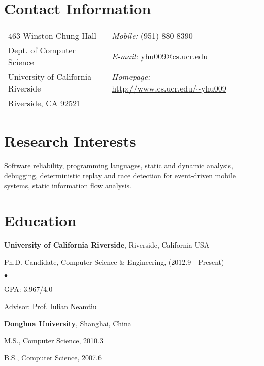 \documentclass[margin,line]{res}
\newenvironment{list1}{
  \begin{list}{\ding{113}}{%
      \setlength{\itemsep}{0in}
      \setlength{\parsep}{0in} \setlength{\parskip}{0in}
      \setlength{\topsep}{0in} \setlength{\partopsep}{0in} 
      \setlength{\leftmargin}{0.17in}}}{\end{list}}
\newenvironment{list2}{
  \begin{list}{$\bullet$}{%
      \setlength{\itemsep}{0in}
      \setlength{\parsep}{0in} \setlength{\parskip}{0in}
      \setlength{\topsep}{0in} \setlength{\partopsep}{0in} 
      \setlength{\leftmargin}{0.2in}}}{\end{list}}
\begin{document}

\begin{resume}
\section{\sc Contact Information}
\vspace{.05in}
\begin{tabular}{@{}p{2in}p{4in}}
463 Winston Chung Hall              & {\it Mobile:}  (951) 880-8390 \\            
Dept. of Computer Science           & {\it E-mail:}  yhu009@cs.ucr.edu\\       
University of California Riverside  & {\it Homepage:} \url{http://www.cs.ucr.edu/~yhu009}\\
Riverside, CA 92521 
\end{tabular}


\section{\sc Research Interests}
Software reliability, programming languages, static and dynamic analysis, 
debugging, deterministic replay and race detection for event-driven mobile systems, 
static information flow analysis.


\section{\sc Education}
{\bf University of California Riverside}, Riverside, California USA\\
\vspace*{-.1in}
\begin{list1}
\item[] Ph.D. Candidate, Computer Science \& Engineering, (2012.9 - Present)
\begin{list2}
\vspace*{.05in}
\item GPA: 3.967/4.0
\item Advisor:  Prof. Iulian Neamtiu
\end{list2}
\end{list1}

{\bf Donghua University}, Shanghai, China\\
\vspace*{-.1in}
\begin{list1}
\item[] M.S., Computer Science,  2010.3
\item[] B.S., Computer Science,  2007.6
\end{list1}



\end{resume}
\end{document}
